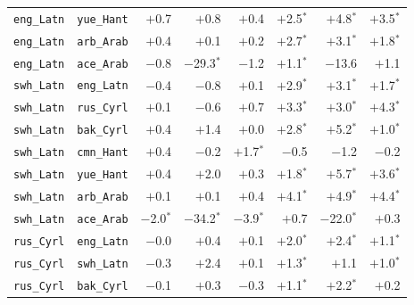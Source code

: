 \begin{longtable}{@{}ll rrr rrr@{}}
\texttt{eng\_Latn} & \texttt{yue\_Hant} & $+$0.7\phantom{$^{*}$} & $+$0.8\phantom{$^{*}$} & $+$0.4\phantom{$^{*}$} & $+$2.5$^{*}$ & $+$4.8$^{*}$ & $+$3.5$^{*}$ \\
\texttt{eng\_Latn} & \texttt{arb\_Arab} & $+$0.4\phantom{$^{*}$} & $+$0.1\phantom{$^{*}$} & $+$0.2\phantom{$^{*}$} & $+$2.7$^{*}$ & $+$3.1$^{*}$ & $+$1.8$^{*}$ \\
\texttt{eng\_Latn} & \texttt{ace\_Arab} & $-$0.8\phantom{$^{*}$} & $-$29.3$^{*}$ & $-$1.2\phantom{$^{*}$} & $+$1.1$^{*}$ & $-$13.6\phantom{$^{*}$} & $+$1.1\phantom{$^{*}$} \\
\addlinespace
\texttt{swh\_Latn} & \texttt{eng\_Latn} & $-$0.4\phantom{$^{*}$} & $-$0.8\phantom{$^{*}$} & $+$0.1\phantom{$^{*}$} & $+$2.9$^{*}$ & $+$3.1$^{*}$ & $+$1.7$^{*}$ \\
\texttt{swh\_Latn} & \texttt{rus\_Cyrl} & $+$0.1\phantom{$^{*}$} & $-$0.6\phantom{$^{*}$} & $+$0.7\phantom{$^{*}$} & $+$3.3$^{*}$ & $+$3.0$^{*}$ & $+$4.3$^{*}$ \\
\texttt{swh\_Latn} & \texttt{bak\_Cyrl} & $+$0.4\phantom{$^{*}$} & $+$1.4\phantom{$^{*}$} & $+$0.0\phantom{$^{*}$} & $+$2.8$^{*}$ & $+$5.2$^{*}$ & $+$1.0$^{*}$ \\
\texttt{swh\_Latn} & \texttt{cmn\_Hant} & $+$0.4\phantom{$^{*}$} & $-$0.2\phantom{$^{*}$} & $+$1.7$^{*}$ & $-$0.5\phantom{$^{*}$} & $-$1.2\phantom{$^{*}$} & $-$0.2\phantom{$^{*}$} \\
\texttt{swh\_Latn} & \texttt{yue\_Hant} & $+$0.4\phantom{$^{*}$} & $+$2.0\phantom{$^{*}$} & $+$0.3\phantom{$^{*}$} & $+$1.8$^{*}$ & $+$5.7$^{*}$ & $+$3.6$^{*}$ \\
\texttt{swh\_Latn} & \texttt{arb\_Arab} & $+$0.1\phantom{$^{*}$} & $+$0.1\phantom{$^{*}$} & $+$0.4\phantom{$^{*}$} & $+$4.1$^{*}$ & $+$4.9$^{*}$ & $+$4.4$^{*}$ \\
\texttt{swh\_Latn} & \texttt{ace\_Arab} & $-$2.0$^{*}$ & $-$34.2$^{*}$ & $-$3.9$^{*}$ & $+$0.7\phantom{$^{*}$} & $-$22.0$^{*}$ & $+$0.3\phantom{$^{*}$} \\
\addlinespace
\texttt{rus\_Cyrl} & \texttt{eng\_Latn} & $-$0.0\phantom{$^{*}$} & $+$0.4\phantom{$^{*}$} & $+$0.1\phantom{$^{*}$} & $+$2.0$^{*}$ & $+$2.4$^{*}$ & $+$1.1$^{*}$ \\
\texttt{rus\_Cyrl} & \texttt{swh\_Latn} & $-$0.3\phantom{$^{*}$} & $+$2.4\phantom{$^{*}$} & $+$0.1\phantom{$^{*}$} & $+$1.3$^{*}$ & $+$1.1\phantom{$^{*}$} & $+$1.0$^{*}$ \\
\texttt{rus\_Cyrl} & \texttt{bak\_Cyrl} & $-$0.1\phantom{$^{*}$} & $+$0.3\phantom{$^{*}$} & $-$0.3\phantom{$^{*}$} & $+$1.1$^{*}$ & $+$2.2$^{*}$ & $+$0.2\phantom{$^{*}$} \\

\end{longtable}
